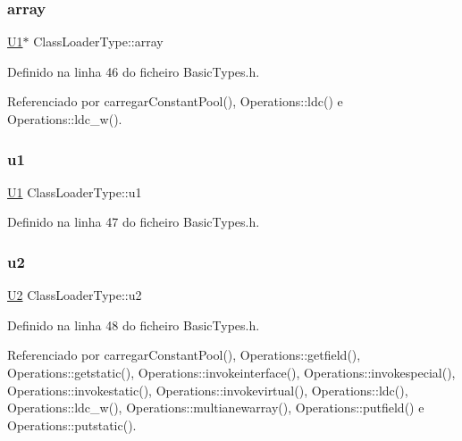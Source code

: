 \subsubsection{\texorpdfstring{array}{array}}
{\footnotesize\ttfamily \hyperlink{BasicTypes_8h_a9bffe5bb2564f91cd90fb7d06848f9a8}{U1}$\ast$ Class\+Loader\+Type\+::array}



Definido na linha 46 do ficheiro Basic\+Types.\+h.



Referenciado por carregar\+Constant\+Pool(), Operations\+::ldc() e Operations\+::ldc\+\_\+w().

\mbox{\label{unionClassLoaderType_ac3612ba54bfba5c4b856dcba8db1a8a8}} 
\subsubsection{\texorpdfstring{u1}{u1}}
{\footnotesize\ttfamily \hyperlink{BasicTypes_8h_a9bffe5bb2564f91cd90fb7d06848f9a8}{U1} Class\+Loader\+Type\+::u1}



Definido na linha 47 do ficheiro Basic\+Types.\+h.

\mbox{\label{unionClassLoaderType_aaf24600dbc4afe99210fa000bdb1e6d7}} 
\subsubsection{\texorpdfstring{u2}{u2}}
{\footnotesize\ttfamily \hyperlink{BasicTypes_8h_a90240657108b1b457eef9d3f76e0202e}{U2} Class\+Loader\+Type\+::u2}



Definido na linha 48 do ficheiro Basic\+Types.\+h.



Referenciado por carregar\+Constant\+Pool(), Operations\+::getfield(), Operations\+::getstatic(), Operations\+::invokeinterface(), Operations\+::invokespecial(), Operations\+::invokestatic(), Operations\+::invokevirtual(), Operations\+::ldc(), Operations\+::ldc\+\_\+w(), Operations\+::multianewarray(), Operations\+::putfield() e Operations\+::putstatic().

